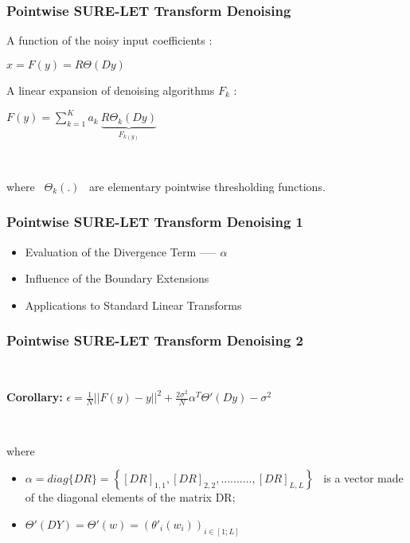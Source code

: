 \documentclass{beamer}
\begin{document}
	
	
	
	
	\begin{frame}
		\frametitle{ Pointwise SURE-LET Transform Denoising}
		A function of the noisy
		input coefficients :
		\begin{center}
			$\hat{x}=F(y)=R\Theta(Dy)$
		\end{center}
		
		A linear
		expansion of denoising algorithms $F_k$ :
		\begin{center}
			$F(y)=\displaystyle\sum_{k=1}^{K}a_k \ \underbrace{R\Theta_k(Dy)}_{F_{k(y)}}$
			
			\
			
where \ $\Theta_k(.)$ \ are elementary pointwise thresholding functions.
		\end{center}
		
	\end{frame}
	
	
	
	\begin{frame}
		\frametitle{Pointwise SURE-LET Transform Denoising 1}
\begin{itemize}
	\item Evaluation of the Divergence Term ----- $\alpha$ 
	\item Influence of the Boundary Extensions
	\item Applications to Standard Linear Transforms
\end{itemize}

\end{frame}
	
	
	\begin{frame}
		\frametitle{Pointwise SURE-LET Transform Denoising 2}

	
	\
	\begin{block}{\textbf{Corollary:}}
$\epsilon=\frac{1}{N}||F(y)-y||^2+\frac{2\sigma^2}{N}\alpha^T\Theta'(Dy)-\sigma^2$

\	

where
\begin{itemize}
	\item $\alpha=diag \{DR\}=\left\{[DR]_{1,1},[DR]_{2,2},..........,[DR]_{L,L}\right\}$ \ is
	a vector made of the diagonal elements of the matrix DR;
\item $\Theta'(DY)=\Theta'(w)=(\theta'_i(w_i))_{i\in[1;L]}$
\end{itemize}

\end{block}
	
	

	
	\end{frame}
	
\end{document}
